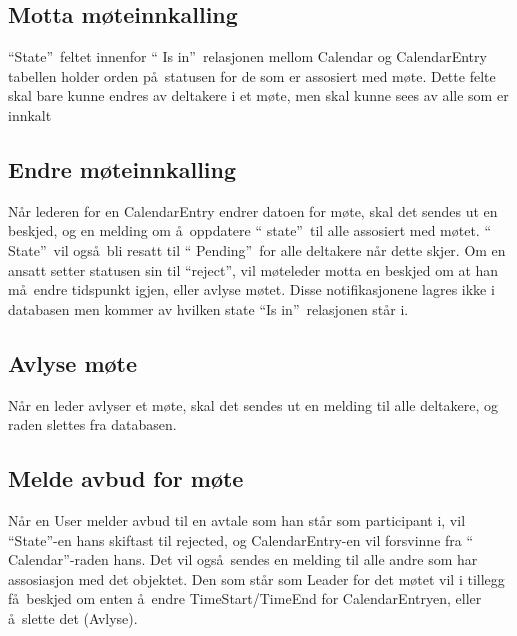 \documentclass{article}
\begin{document}
\subsection{Motta m\o teinnkalling}

\textquotedblleft State\textquotedblright\ feltet innenfor \textquotedblleft
Is in\textquotedblright\ relasjonen mellom Calendar og CalendarEntry
tabellen holder orden p\aa\ statusen for de som er assosiert med m\o te.
Dette felte skal bare kunne endres av deltakere i et m\o te, men skal kunne
sees av alle som er innkalt

\subsection{Endre m\o teinnkalling}

N\aa r lederen for en CalendarEntry endrer datoen for m\o te, skal det
sendes ut en beskjed, og en melding om \aa\ oppdatere \textquotedblleft
state\textquotedblright\ til alle assosiert med m\o tet. \textquotedblleft
State\textquotedblright\ vil ogs\aa\ bli resatt til \textquotedblleft
Pending\textquotedblright\ for alle deltakere n\aa r dette skjer. Om en
ansatt setter statusen sin til \textquotedblleft reject\textquotedblright ,
vil m\o teleder motta en beskjed om at han m\aa\ endre tidspunkt igjen,
eller avlyse m\o tet. Disse notifikasjonene lagres ikke i databasen men
kommer av hvilken state \textquotedblleft Is in\textquotedblright\
relasjonen st\aa r i.

\subsection{Avlyse m\o te}

N\aa r en leder avlyser et m\o te, skal det sendes ut en melding til alle
deltakere, og raden slettes fra databasen.

\subsection{Melde avbud for m\o te}

N\aa r en User melder avbud til en avtale som han st\aa r som participant i,
vil \textquotedblleft State\textquotedblright -en hans skiftast til
rejected, og CalendarEntry-en vil forsvinne fra \textquotedblleft
Calendar\textquotedblright -raden hans. Det vil ogs\aa\ sendes en melding
til alle andre som har assosiasjon med det objektet. Den som st\aa r som
Leader for det m\o tet vil i tillegg f\aa\ beskjed om enten \aa\ endre
TimeStart/TimeEnd for CalendarEntryen, eller \aa\ slette det (Avlyse).
\end{document}
